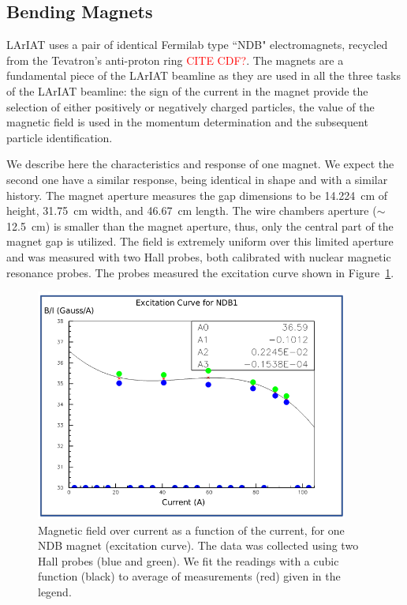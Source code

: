 \subsection{Bending Magnets}\label{sec:Magnets}
LArIAT uses a pair of identical Fermilab type ``NDB" electromagnets, recycled from the Tevatron's anti-proton ring \textcolor{red}{CITE CDF?}. 
The magnets are a fundamental piece of the LArIAT beamline as they are used in all the three tasks of the LArIAT beamline: the sign of the current in the magnet provide the selection of either positively or negatively charged particles, the value of the magnetic field is used in the momentum determination and the subsequent particle identification. 

We describe here the characteristics and response of one magnet. We expect the second one have a similar response, being identical in shape and with a similar history. The magnet aperture measures the gap dimensions to be 14.224~cm of height, 31.75~cm width, and  46.67~cm length.  The wire chambers aperture ($\sim$12.5~cm) is smaller than the magnet aperture, thus, only the central part of the magnet gap is utilized. The field is extremely uniform over this limited aperture and was measured with two Hall probes, both calibrated with nuclear magnetic resonance probes. The probes measured the excitation curve shown in Figure~\ref{fig:magnet_excitation}. 

\begin{figure}[!h]
\begin{centering}
\vspace{-0.3cm}
\includegraphics[height=3.0in]{Chapter-3/Images/ExcitationCurves.png}
\caption{
{ Magnetic field over current as a function of the current, for one NDB magnet (excitation curve). The data was collected using two Hall probes (blue and green). We fit the readings with a cubic function (black) to average of measurements (red) given in the legend.}
}
\label{fig:magnet_excitation}
\end{centering}
\end{figure}

